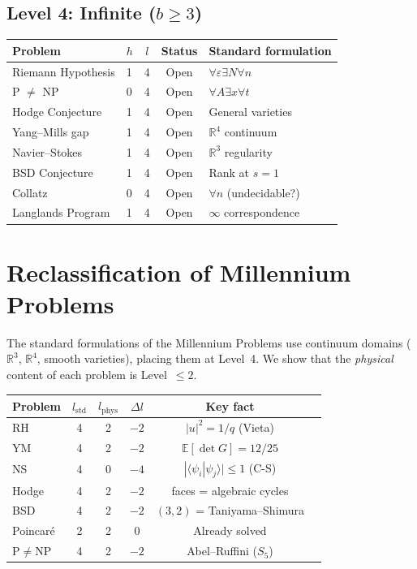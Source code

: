 \documentclass[12pt]{article}
\theoremstyle{remark}
\newcommand{\RR}{\mathbb{R}}
\begin{document}
\subsection{Level 4: Infinite ($b \ge 3$)}

\begin{center}
\begin{tabular}{llccl}
\toprule
Problem & $h$ & $l$ & Status & Standard formulation \\
\midrule
Riemann Hypothesis & 1 & 4 & Open & $\forall\varepsilon\exists N\forall n$ \\
P $\ne$ NP & 0 & 4 & Open & $\forall A\exists x\forall t$ \\
Hodge Conjecture & 1 & 4 & Open & General varieties \\
Yang--Mills gap & 1 & 4 & Open & $\RR^4$ continuum \\
Navier--Stokes & 1 & 4 & Open & $\RR^3$ regularity \\
BSD Conjecture & 1 & 4 & Open & Rank at $s = 1$ \\
Collatz & 0 & 4 & Open & $\forall n$ (undecidable?) \\
Langlands Program & 1 & 4 & Open & $\infty$ correspondence \\
\bottomrule
\end{tabular}
\end{center}

\section{Reclassification of Millennium Problems}

The standard formulations of the Millennium Problems use
continuum domains ($\RR^3$, $\RR^4$, smooth varieties),
placing them at Level~4. We show that the \emph{physical}
content of each problem is Level~$\le 2$.

\begin{center}
\begin{tabular}{lccccl}
\toprule
Problem & $l_{\mathrm{std}}$ & $l_{\mathrm{phys}}$ & $\Delta l$ & Key fact \\
\midrule
RH & 4 & 2 & $-2$ & $|u|^2 = 1/q$ (Vieta) \\
YM & 4 & 2 & $-2$ & $\mathbb{E}[\det G] = 12/25$ \\
NS & 4 & 0 & $-4$ & $|\langle\psi_i|\psi_j\rangle| \le 1$ (C-S) \\
Hodge & 4 & 2 & $-2$ & faces = algebraic cycles \\
BSD & 4 & 2 & $-2$ & $(3,2)$ = Taniyama--Shimura \\
Poincar\'e & 2 & 2 & $0$ & Already solved \\
P$\ne$NP & 4 & 2 & $-2$ & Abel--Ruffini ($S_5$) \\
\bottomrule
\end{tabular}
\end{center}
\end{document}
